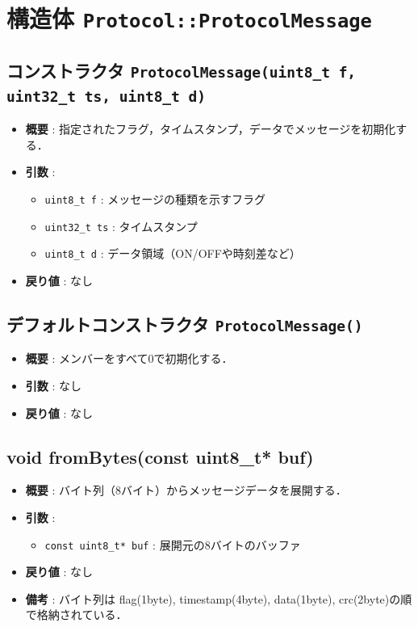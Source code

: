 \documentclass[a4paper,12pt]{article}
\begin{document}
\section{構造体 \texttt{Protocol::ProtocolMessage}}

\subsection{コンストラクタ \texttt{ProtocolMessage(uint8\_t f, uint32\_t ts, uint8\_t d)}}
\begin{itemize}
  \item \textbf{概要} : 指定されたフラグ，タイムスタンプ，データでメッセージを初期化する．
  \item \textbf{引数} :
  \begin{itemize}
    \item \texttt{uint8\_t f} : メッセージの種類を示すフラグ
    \item \texttt{uint32\_t ts} : タイムスタンプ
    \item \texttt{uint8\_t d} : データ領域（ON/OFFや時刻差など）
  \end{itemize}
  \item \textbf{戻り値} : なし
\end{itemize}

\subsection{デフォルトコンストラクタ \texttt{ProtocolMessage()}}
\begin{itemize}
  \item \textbf{概要} : メンバーをすべて0で初期化する．
  \item \textbf{引数} : なし
  \item \textbf{戻り値} : なし
\end{itemize}

\subsection{void fromBytes(const uint8\_t* buf)}
\begin{itemize}
  \item \textbf{概要} : バイト列（8バイト）からメッセージデータを展開する．
  \item \textbf{引数} :
  \begin{itemize}
    \item \texttt{const uint8\_t* buf} : 展開元の8バイトのバッファ
  \end{itemize}
  \item \textbf{戻り値} : なし
  \item \textbf{備考} : バイト列は flag(1byte), timestamp(4byte), data(1byte), crc(2byte)の順で格納されている．
\end{itemize}
\end{document}
